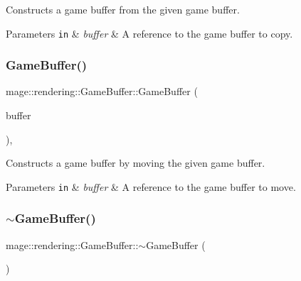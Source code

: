 Constructs a game buffer from the given game buffer.


\begin{DoxyParams}[1]{Parameters}
\mbox{\tt in}  & {\em buffer} & A reference to the game buffer to copy. \\
\hline
\end{DoxyParams}
\hypertarget{structmage_1_1rendering_1_1_game_buffer_a4f151da7c4b17426f9293d72f3621583}{}\label{structmage_1_1rendering_1_1_game_buffer_a4f151da7c4b17426f9293d72f3621583} 
\subsubsection{\texorpdfstring{Game\+Buffer()}{GameBuffer()}\hspace{0.1cm}{\footnotesize\ttfamily [3/3]}}
{\footnotesize\ttfamily mage\+::rendering\+::\+Game\+Buffer\+::\+Game\+Buffer (\begin{DoxyParamCaption}\item[{\hyperlink{structmage_1_1rendering_1_1_game_buffer}{Game\+Buffer} \&\&}]{buffer }\end{DoxyParamCaption})\hspace{0.3cm}{\ttfamily [default]}, {\ttfamily [noexcept]}}

Constructs a game buffer by moving the given game buffer.


\begin{DoxyParams}[1]{Parameters}
\mbox{\tt in}  & {\em buffer} & A reference to the game buffer to move. \\
\hline
\end{DoxyParams}
\hypertarget{structmage_1_1rendering_1_1_game_buffer_a7cf8e2d277f99d447af729a6a92fe572}{}\label{structmage_1_1rendering_1_1_game_buffer_a7cf8e2d277f99d447af729a6a92fe572} 
\subsubsection{\texorpdfstring{$\sim$\+Game\+Buffer()}{~GameBuffer()}}
{\footnotesize\ttfamily mage\+::rendering\+::\+Game\+Buffer\+::$\sim$\+Game\+Buffer (\begin{DoxyParamCaption}{ }\end{DoxyParamCaption})\hspace{0.3cm}{\ttfamily [default]}}

